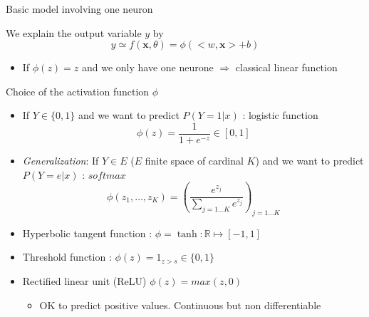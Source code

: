 \documentclass[ignorenonframetext,]{beamer}
\providecommand{\tightlist}{%
  \setlength{\itemsep}{0pt}\setlength{\parskip}{0pt}}
\begin{document}
\begin{frame}{Basic model involving one neuron}
\protect\hypertarget{basic-model-involving-one-neuron}{}

We explain the output variable \(y\) by
\[ y \simeq f(\mathbf{x},\theta) =  \phi(<w,\mathbf{x}> + b)\]

\begin{itemize}
\tightlist
\item
  If \(\phi(z) =z\) and we only have one neurone \(\Rightarrow\)
  classical linear function
\end{itemize}

\end{frame}

\begin{frame}{Choice of the activation function \(\phi\)}
\protect\hypertarget{choice-of-the-activation-function-phi}{}

\begin{itemize}
\item
  If \(Y \in \{0,1\}\) and we want to predict \(P(Y=1|x)\) : logistic
  function \[\phi(z) = \frac{1}{1+e^{-z}} \in [0,1]\]
\item
  \emph{Generalization}: If \(Y \in E\) (\(E\) finite space of cardinal
  \(K\)) and we want to predict \(P(Y= e|x)\) : \(softmax\)
  \[\phi(z_1, \dots, z_K) =\left(\frac{e^{z_j}}{\sum_{j = 1\dots K} e^{z_j}}\right)_{j=1\dots K}\]
\item
  Hyperbolic tangent function :
  \(\phi = \tanh:\mathbb{R} \mapsto [-1,1]\)
\item
  Threshold function : \(\phi(z) = 1_{z>s} \in \{0,1\}\)
\item
  Rectified linear unit (ReLU) \(\phi(z) = max(z,0)\)

  \begin{itemize}
  \tightlist
  \item
    OK to predict positive values. Continuous but non differentiable
  \end{itemize}
\end{itemize}

\end{frame}
\end{document}
